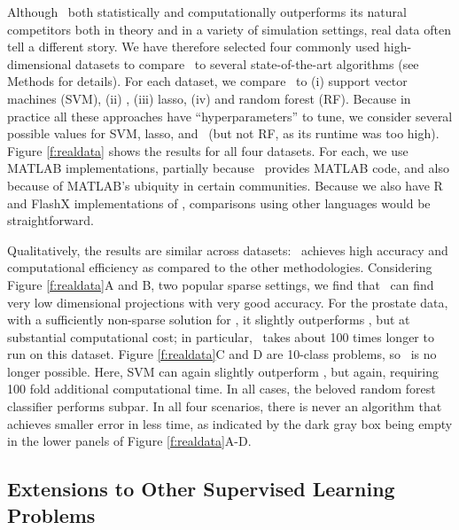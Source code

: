 \documentclass[10pt]{article}
\begin{document}
Although \Lol~both statistically and computationally outperforms its natural competitors both in theory and in a variety of simulation settings, real data often tell a different story. 
% 
We have  therefore selected four commonly used high-dimensional datasets to compare \Lol~to several state-of-the-art algorithms (see Methods for details).  For each dataset, we compare \Lol~to (i) support vector machines (SVM), (ii) \Road, (iii) lasso, (iv) and random forest (RF).  Because in practice all these approaches have ``hyperparameters'' to tune, we consider several possible values for  SVM, lasso, and \Lol~(but not RF, as its runtime was too high).  Figure \ref{f:realdata} shows the results for all four datasets. For each, we use MATLAB implementations, partially because \Road~provides MATLAB code, and also because of MATLAB's ubiquity in certain communities.  Because we also have R and FlashX implementations of \Lol, comparisons using other languages would be straightforward.





Qualitatively, the results are similar across datasets: \Lol~achieves high accuracy and computational efficiency as compared to the other methodologies.  Considering Figure \ref{f:realdata}A and B, two popular sparse settings, we find that \Lol~can find very low dimensional projections with very good accuracy. For the prostate data, with a sufficiently non-sparse solution for \Road, it slightly outperforms \Lol, but at substantial computational cost; in particular, \Road~takes about 100 times longer to run on this dataset.   Figure \ref{f:realdata}C and D are 10-class problems, so \Road~is no longer possible.  Here, SVM can again slightly outperform \Lol, but again, requiring 100 fold additional computational time.  In all cases, the beloved random forest classifier performs subpar. In all four scenarios, there is never an algorithm that achieves smaller error in less time, as indicated by the dark gray box being empty in the lower panels of Figure \ref{f:realdata}A-D.


\subsection*{Extensions to Other Supervised Learning Problems}
\end{document}
